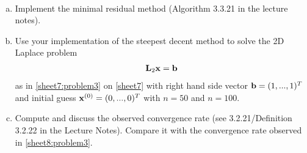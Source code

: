 \begin{Sheet}
  \begin{Problem}[Programming]
	\label{sheet8:problem4}
	\hfill\\\vspace{-6ex}
	\begin{enumerate}[(a)]
		\item Implement the minimal residual method (Algorithm 3.3.21 in the
		lecture notes).
		\item Use your implementation of the steepest decent method to
		solve the 2D Laplace problem
		\begin{gather*}
		\mathbf L_2\mathbf x=\mathbf b
		\end{gather*}
		as in \cref{sheet7:problem3} on \cref{sheet7} with right hand
		side vector $\mathbf b=(1,...,1)^T$ and initial guess
		$\mathbf x^{(0)}=(0,...,0)^T$ with $n=50$ and $n=100$. 
		\item Compute and discuss the observed convergence rate (see 3.2.21/Definition 3.2.22 in the Lecture Notes).
		Compare it with the convergence rate observed in \cref{sheet8:problem3}.
	\end{enumerate}
  \end{Problem}

  \vfill
  
  

\end{Sheet}



